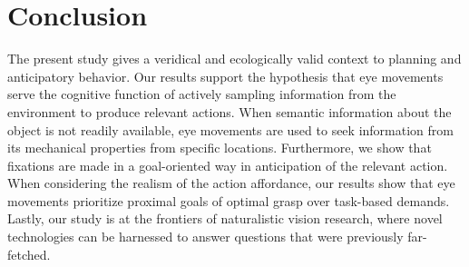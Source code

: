 \section{Conclusion}

The present study gives a veridical and ecologically valid context to planning and anticipatory behavior. Our results support the hypothesis that eye movements serve the cognitive function of actively sampling information from the environment to produce relevant actions. When semantic information about the object is not readily available, eye movements are used to seek information from its mechanical properties from specific locations. Furthermore, we show that fixations are made in a goal-oriented way in anticipation of the relevant action. When considering the realism of the action affordance, our results show that eye movements prioritize proximal goals of optimal grasp over task-based demands. Lastly, our study is at the frontiers of naturalistic vision research, where novel technologies can be harnessed to answer questions that were previously far-fetched.



